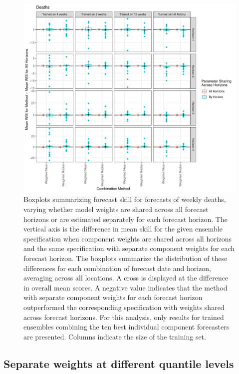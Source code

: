 \documentclass[review]{elsarticle}
\begin{document}
\begin{figure}
  \includegraphics[width=\textwidth]{figures/wis_boxplots_horizon_grouping_Deaths.pdf}
  \caption{Boxplots summarizing forecast skill for forecasts of weekly deaths, varying whether model weights are shared across all forecast horizons or are estimated separately for each forecast horizon.
  The vertical axis is the difference in mean skill for the given ensemble specification when component weights are shared across all horizons and the same specification with separate component weights for each forecast horizon.
  The boxplots summarize the distribution of these differences for each combination of forecast date and horizon, averaging across all locations.
  A cross is displayed at the difference in overall mean scores.
  A negative value indicates that the method with separate component weights for each forecast horizon outperformed the corresponding specification with weights shared across forecast horizons.
  For this analysis, only results for trained ensembles combining the ten best individual component forecasters are presented.
  Columns indicate the size of the training set.}
\end{figure}


\subsection{Separate weights at different quantile levels}
\end{document}
